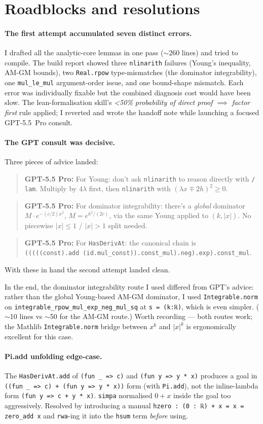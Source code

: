 \documentclass[11pt]{article}
\newcommand{\gptbox}[1]{\par\medskip\begin{quote}\small\textbf{\textcolor{green!50!black}{GPT-5.5 Pro:}} #1\end{quote}\medskip}
\begin{document}
\section{Roadblocks and resolutions}

\paragraph{The first attempt accumulated seven distinct errors.} I
drafted all the analytic-core lemmas in one pass (\(\sim\)260 lines)
and tried to compile. The build report showed three \texttt{nlinarith}
failures (Young's inequality, AM-GM bounds), two \texttt{Real.rpow}
type-mismatches (the dominator integrability), one \texttt{mul\_le\_mul}
argument-order issue, and one bound-shape mismatch. Each error was
individually fixable but the combined diagnosis cost would have been
slow. The lean-formalisation skill's \emph{<50\% probability of direct
proof \(\implies\) factor first} rule applied; I reverted and wrote
the handoff note while launching a focused GPT-5.5~Pro consult.

\paragraph{The GPT consult was decisive.} Three pieces of advice
landed:
\gptbox{For Young: don't ask \texttt{nlinarith} to reason directly with
\texttt{/ lam}. Multiply by \(4\lambda\) first, then \texttt{nlinarith}
with \((\lambda x \mp 2h)^2 \ge 0\).}
\gptbox{For dominator integrability: there's a \emph{global} dominator
\(M \cdot e^{-(c/2) x^2}\), \(M = e^{k^2/(2c)}\), via the same Young
applied to \((k, |x|)\). No piecewise \(|x| \le 1\) / \(|x| > 1\) split
needed.}
\gptbox{For \texttt{HasDerivAt}: the canonical chain is\\
\texttt{(((((const).add (id.mul\_const)).const\_mul).neg).exp).const\_mul}.}
With these in hand the second attempt landed clean.

In the end, the dominator integrability route I used differed from
GPT's advice: rather than the global Young-based AM-GM dominator,
I used \texttt{Integrable.norm} on
\texttt{integrable\_rpow\_mul\_exp\_neg\_mul\_sq} at \texttt{s = (k:ℝ)},
which is even simpler. (\(\sim\)10 lines vs \(\sim\)50 for the AM-GM
route.) Worth recording — both routes work; the Mathlib
\texttt{Integrable.norm} bridge between \(x^k\) and \(|x|^k\) is
ergonomically excellent for this case.

\paragraph{Pi.add unfolding edge-case.} The \texttt{HasDerivAt.add}
of \texttt{(fun \_ => c)} and \texttt{(fun y => y * x)} produces a
goal in \texttt{((fun \_ => c) + (fun y => y * x))} form (with
\texttt{Pi.add}), not the inline-lambda form
\texttt{(fun y => c + y * x)}. \texttt{simpa} normalised \(0 + x\)
inside the goal too aggressively. Resolved by introducing a manual
\texttt{hzero : (0 : ℝ) + x = x = zero\_add x} and \texttt{rwa}-ing
it into the \texttt{hsum} term \emph{before} using.
\end{document}
